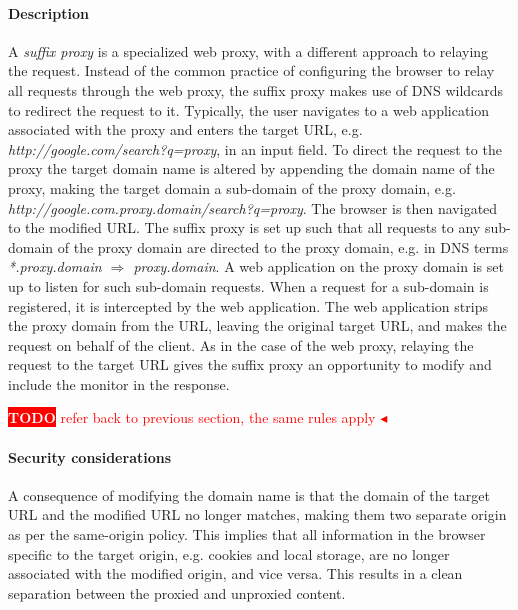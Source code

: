 \documentclass{llncs}
\newcommand{\todo}[1]{\colorbox{red}{\textcolor{white}{\sffamily\bfseries\scriptsize TODO}} \textcolor{red}{#1} \textcolor{red}{$\blacktriangleleft$}}
\begin{document}
\paragraph{Description}
A \emph{suffix proxy} is a specialized web proxy, with a different approach to relaying the request. 
Instead of the common practice of configuring the browser to relay all requests through the web proxy,
the suffix proxy makes use of DNS wildcards to redirect the request to it.
Typically, the user navigates to a 
web application associated with the proxy and enters the target URL, e.g. \emph{http://google.com/search?q=proxy}, in 
an input field. To direct the request to the proxy the target domain name is altered
by appending the domain name of the proxy, making the target domain a sub-domain of the proxy domain, e.g. \emph{http://google.com.proxy.domain/search?q=proxy}. 
The browser is then navigated to the modified URL.
The suffix proxy is set up such
that all requests to any sub-domain of the proxy domain are directed to the proxy domain, 
e.g. in DNS terms \emph{*.proxy.domain $\Rightarrow$ proxy.domain}. 
A web application on the proxy domain is set up to listen for such sub-domain requests.
When a request for a sub-domain is registered, it is intercepted by the web application.
The web application strips the proxy domain from the URL, leaving the original target URL, 
and makes the request on behalf of the client. As in the case of the web proxy, 
relaying the request to the target URL gives the suffix proxy an opportunity to modify and 
include the monitor in the response.

\todo{refer back to previous section, the same rules apply}






\paragraph{Security considerations}

A consequence of modifying the domain name is that the domain of the
target URL and the modified URL no longer matches, making them two 
separate origin as per the same-origin policy. This implies that all information in 
the browser specific to the target origin, e.g. cookies and local storage, 
are no longer associated with the modified origin, and vice versa. This results 
in a clean separation between the proxied and unproxied content.  
\end{document}
